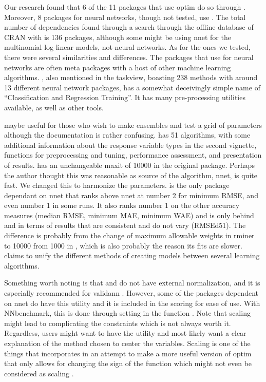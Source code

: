 Our research found that 6 of the 11 packages that use optim do so
through . Moreover, 8 packages for neural networks, though
not tested, use . The total number of 
dependencies found through a search through the offline database of CRAN
with  is 136 packages, although some might be using
nnet for the multinomial log-linear models, not neural networks. As for
the ones we tested, there were several similarities and differences. The
packages that use  for neural networks are often meta
packages with a host of other machine learning algorithms.
 \citep{R-caret}, also mentioned in the taskview,
boasting 238 methods with around 13 different neural network packages,
has a somewhat deceivingly simple name of ``Classification and
Regression Training''. It has many pre-processing utilities available,
as well as other tools.

 \citep{R-EnsembleBase} maybe useful for those who
wish to make ensembles and test a grid of parameters although the
documentation is rather confusing. 
\citep{R-MachineShop} has 51 algorithms, with some additional
information about the response variable types in the second vignette,
functions for preprocessing and tuning, performance assessment, and
presentation of results.  \citep{R-radiant.model}
has an unchangeable maxit of 10000 in the original package. Perhaps the
author thought this was reasonable as source of the algorithm, nnet, is
quite fast. We changed this to harmonize the parameters.
 \citep{R-rminer} is the only package dependant on nnet
that ranks above nnet at number 2 for minimum RMSE, and even number 1 in
some runs. It also ranks number 1 on the other accuracy measures (median
RMSE, minimum MAE, minimum WAE) and is only behind 
and  in terms of results that are consistent and do
not vary (RMSEd51). The difference is probably from the change of
maximum allowable weights in rminer to 10000 from 1000 in
, which is also probably the reason its fits are slower.
 \citep{R-traineR} claims to unify the different
methods of creating models between several learning algorithms.

Something worth noting is that  and  do
not have external normalization, and it is especially recommended for
validann . However, some of the packages dependent on nnet do have this
utility and it is included in the scoring for ease of use. With
NNbenchmark, this is done through setting  in the
function . Note that scaling might lead to complicating
the constraints which is not always worth it. Regardless, users might
want to have the utility and most likely want a clear explanation of the
method chosen to center the variables. Scaling is one of the things that
 \citep{R-optimx} incorporates in an attempt to make a
more useful version of optim that only allows for changing the sign of
the function which might not even be considered as scaling
\citep{Nash-nlpor14}.

